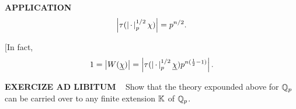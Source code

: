 \vspace{0.1cm}

\begin{x}{\small\bf APPLICATION} \ %
\[
\left\vert\tau(\left\vert\hspace{0.05cm} \cdot \hspace{0.05cm}\right\vert_p^{1/2} \chi)\right\vert = p^{n/2}.
\]

[In fact,
\[
1 = \left\vert W(\underline{\chi}) \right\vert = \left\vert\tau(\left\vert\hspace{0.05cm} \cdot \hspace{0.05cm}\right\vert_p^{1/2} \underline{\chi}) p^{n(\frac{1}{2} - 1)} \right\vert.
\]
\end{x}

\vspace{0.2cm}


\begin{x}{\small\bf EXERCIZE AD LIBITUM} \ %
Show that the theory expounded above for $\mathbb{Q}_p$ can be carried over to any finite extension $\mathbb{K}$ of $\mathbb{Q}_p$.
\end{x}





















